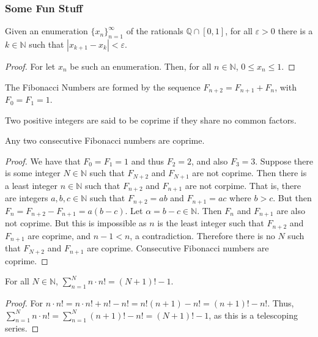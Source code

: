 \documentclass[crop=false,class=book,oneside]{standalone}
\begin{document}
            \subsubsection{Some Fun Stuff}
            \begin{theorem}
            Given an enumeration $\{x_n\}_{n=1}^{\infty}$ of the rationals $\mathbb{Q}\cap [0,1]$, for all $\varepsilon>0$ there is a $k\in \mathbb{N}$ such that $|x_{k+1}-x_k|<\varepsilon$.
            \end{theorem}
            \begin{proof}
            For let $x_n$ be such an enumeration. Then, for all $n\in \mathbb{N}$, $0 \leq x_n \leq 1$.
            \end{proof}
            \begin{definition}
            The Fibonacci Numbers are formed by the sequence $F_{n+2}=F_{n+1}+F_{n}$, with $F_0=F_1 = 1$.
            \end{definition}
            \begin{definition}
            Two positive integers are said to be coprime if they share no common factors.
            \end{definition}
            \begin{theorem}
            Any two consecutive Fibonacci numbers are coprime.
            \end{theorem}
            \begin{proof}
            We have that $F_0=F_1 = 1$ and thus $F_2 = 2$, and also $F_3 = 3$. Suppose there is some integer $N\in \mathbb{N}$ such that $F_{N+2}$ and $F_{N+1}$ are not coprime. Then there is a least integer $n\in \mathbb{N}$ such that $F_{n+2}$ and $F_{n+1}$ are not corpime. That is, there are integers $a,b,c\in \mathbb{N}$ such that $F_{n+2} = ab$ and $F_{n+1} = ac$ where $b>c$. But then $F_{n} = F_{n+2} - F_{n+1} = a(b-c)$. Let $\alpha = b-c \in \mathbb{N}$. Then $F_n$ and $F_{n+1}$ are also not coprime. But this is impossible as $n$ is the least integer such that $F_{n+2}$ and $F_{n+1}$ are coprime, and $n-1<n$, a contradiction. Therefore there is no $N$ such that $F_{N+2}$ and $F_{n+1}$ are coprime. Consecutive Fibonacci numbers are coprime. 
            \end{proof}
            \begin{theorem}
            For all $N\in \mathbb{N}$, $\sum_{n=1}^{N} n\cdot n! = (N+1)!-1$.
            \end{theorem}
            \begin{proof}
            For $n\cdot n! = n\cdot n! + n! - n! = n!(n+1) - n!=(n+1)!-n!$. Thus, $\sum_{n=1}^{N} n\cdot n! = \sum_{n=1}^{N} (n+1)! -n! = (N+1)!-1$, as this is a telescoping series.
            \end{proof}
\end{document}
